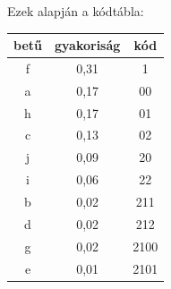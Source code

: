 \documentclass[margin=0px]{article}
\begin{document}
\begin{description}
					Ezek alapján a kódtábla:
					
					\begin{tabular}{|c|c|c|}
						\hline betű & gyakoriság & kód \\
						\hline f & 0,31 & 1 \\ 
						\hline a & 0,17 & 00\\ 
						\hline h & 0,17 & 01\\ 
						\hline c & 0,13 & 02\\ 
						\hline j & 0,09 & 20\\ 
						\hline i & 0,06 & 22\\ 
						\hline b & 0,02 & 211\\ 
						\hline d & 0,02 & 212\\ 
						\hline g & 0,02 & 2100\\ 
						\hline e & 0,01 & 2101\\ 
						\hline 
					\end{tabular} 
			\end{description}
\end{document}

